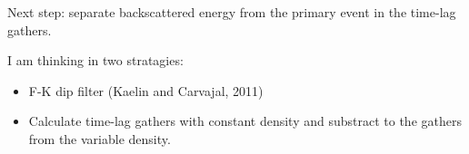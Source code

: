 \begin{frame}  \end{frame}
\begin{frame}  \end{frame}
\begin{frame}  \end{frame}
\begin{frame}  \end{frame}
\begin{frame}  \end{frame}
\begin{frame}  \end{frame}
\begin{frame}  \end{frame}
\begin{frame}  \end{frame}







\begin{frame}

Next step: separate backscattered energy from the primary event 
in the time-lag gathers.

I am thinking in two stratagies:
\begin{itemize}
\item F-K dip filter (Kaelin and Carvajal, 2011)
\item Calculate time-lag gathers with constant density and 
substract to the gathers from the variable density.
\end{itemize}
\end{frame}

